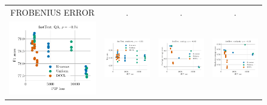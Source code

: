 \begin{figure}
\begin{tabular}{@{\hskip -0.0in}c@{\hskip -0.0in}c@{\hskip -0.0in}c@{\hskip -0.0in}c@{\hskip -0.0in}}
		FROBENIUS ERROR & . & . & . \\		
		\includegraphics[width=.245\linewidth]{figures/fasttext1m_qa_best-f1_vs_gram-large-dim-frob-error_linx.pdf} &
		\includegraphics[width=.245\linewidth]{figures/fasttext1m_sentiment_trec_test-acc_vs_gram-large-dim-frob-error_linx.pdf} &
		\includegraphics[width=.245\linewidth]{figures/fasttext1m_intrinsics_analogy-avg-score_vs_gram-large-dim-frob-error_linx.pdf} &
		\includegraphics[width=.245\linewidth]{figures/fasttext1m_intrinsics_similarity-avg-score_vs_gram-large-dim-frob-error_linx.pdf} \\
		

\end{tabular}
\end{figure}
